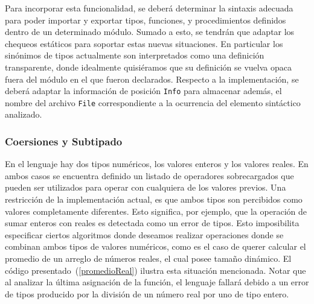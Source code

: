 Para incorporar esta funcionalidad, se deberá determinar la sintaxis adecuada para poder importar y exportar tipos, funciones, y procedimientos definidos dentro de un determinado módulo.
Sumado a esto, se tendrán que adaptar los chequeos estáticos para soportar estas nuevas situaciones.
En particular los sinónimos de tipos actualmente son interpretados como una definición transparente, donde idealmente quisiéramos que su definición se vuelva opaca fuera del módulo en el que fueron declarados.
Respecto a la implementación, se deberá adaptar la información de posición \lstinline[style = haskell]{Info} para almacenar además, el nombre del archivo \lstinline[style = haskell]{File} correspondiente a la ocurrencia del elemento sintáctico analizado.

\subsubsection{Coersiones y Subtipado}

En el lenguaje hay dos tipos numéricos, los valores enteros y los valores reales.
En ambos casos se encuentra definido un listado de operadores sobrecargados que pueden ser utilizados para operar con cualquiera de los valores previos.
Una restricción de la implementación actual, es que ambos tipos son percibidos como valores completamente diferentes.
Esto significa, por ejemplo, que la operación de sumar enteros con reales es detectada como un error de tipos.
Esto imposibilita especificar ciertos algoritmos donde deseamos realizar operaciones donde se combinan ambos tipos de valores numéricos, como es el caso de querer calcular el promedio de un arreglo de números reales, el cual posee tamaño dinámico.
El código presentado~(\ref{promedioReal}) ilustra esta situación mencionada.
Notar que al analizar la última asignación de la función, el lenguaje fallará debido a un error de tipos producido por la división de un número real por uno de tipo entero.

